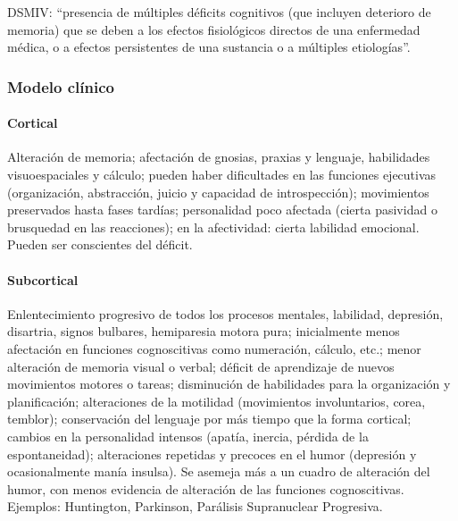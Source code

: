 DSMIV: “presencia de múltiples déficits cognitivos (que incluyen deterioro de memoria) que se deben a los efectos fisiológicos directos de una enfermedad médica, o a efectos persistentes de una sustancia o a múltiples etiologías”.
\subsubsection*{Modelo clínico}
\paragraph{Cortical} Alteración de memoria; afectación de gnosias, praxias y lenguaje, habilidades visuoespaciales y cálculo; pueden haber dificultades en las funciones ejecutivas (organización, abstracción, juicio y capacidad de introspección); movimientos preservados hasta fases tardías; personalidad poco afectada (cierta pasividad o brusquedad en las reacciones); en la afectividad: cierta labilidad emocional. Pueden ser conscientes del déficit.
\paragraph{Subcortical} Enlentecimiento progresivo de todos los procesos mentales, labilidad, depresión, disartria, signos bulbares, hemiparesia motora pura; inicialmente menos afectación en funciones cognoscitivas como numeración, cálculo, etc.; menor alteración de memoria visual o verbal; déficit de aprendizaje de nuevos movimientos motores o tareas; disminución de habilidades para la organización y planificación; alteraciones de la motilidad (movimientos involuntarios, corea, temblor); conservación del lenguaje por más tiempo que la forma cortical; cambios en la personalidad intensos (apatía, inercia, pérdida de la espontaneidad); alteraciones repetidas y precoces en el humor (depresión y ocasionalmente manía insulsa). Se asemeja más a un cuadro de alteración del humor, con menos evidencia de alteración de las funciones cognoscitivas. Ejemplos: Huntington, Parkinson, Parálisis Supranuclear Progresiva.
